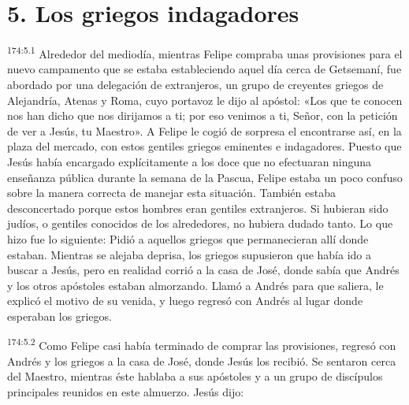\section*{5. Los griegos indagadores}
\par 
\textsuperscript{174:5.1} Alrededor del mediodía, mientras Felipe compraba unas provisiones para el nuevo campamento que se estaba estableciendo aquel día cerca de Getsemaní, fue abordado por una delegación de extranjeros, un grupo de creyentes griegos de Alejandría, Atenas y Roma, cuyo portavoz le dijo al apóstol: «Los que te conocen nos han dicho que nos dirijamos a ti; por eso venimos a ti, Señor, con la petición de ver a Jesús, tu Maestro». A Felipe le cogió de sorpresa el encontrarse así, en la plaza del mercado, con estos gentiles griegos eminentes e indagadores. Puesto que Jesús había encargado explícitamente a los doce que no efectuaran ninguna enseñanza pública durante la semana de la Pascua, Felipe estaba un poco confuso sobre la manera correcta de manejar esta situación. También estaba desconcertado porque estos hombres eran gentiles extranjeros. Si hubieran sido judíos, o gentiles conocidos de los alrededores, no hubiera dudado tanto. Lo que hizo fue lo siguiente: Pidió a aquellos griegos que permanecieran allí donde estaban. Mientras se alejaba deprisa, los griegos supusieron que había ido a buscar a Jesús, pero en realidad corrió a la casa de José, donde sabía que Andrés y los otros apóstoles estaban almorzando. Llamó a Andrés para que saliera, le explicó el motivo de su venida, y luego regresó con Andrés al lugar donde esperaban los griegos.

\par 
\textsuperscript{174:5.2} Como Felipe casi había terminado de comprar las provisiones, regresó con Andrés y los griegos a la casa de José, donde Jesús los recibió. Se sentaron cerca del Maestro, mientras éste hablaba a sus apóstoles y a un grupo de discípulos principales reunidos en este almuerzo. Jesús dijo:

